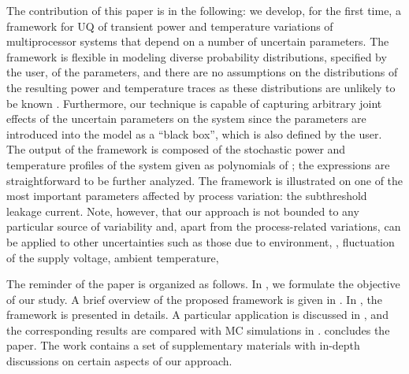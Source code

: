 The contribution of this paper is in the following: we develop, for the first time, a framework for UQ of transient power and temperature variations of multiprocessor systems that depend on a number of uncertain parameters. The framework is flexible in modeling diverse probability distributions, specified by the user, of the parameters, and there are no assumptions on the distributions of the resulting power and temperature traces as these distributions are unlikely to be known \apriori. Furthermore, our technique is capable of capturing arbitrary joint effects of the uncertain parameters on the system since the parameters are introduced into the model as a ``black box'', which is also defined by the user. The output of the framework is composed of the stochastic power and temperature profiles of the system given as polynomials of \rvs; the expressions are straightforward to be further analyzed. The framework is illustrated on one of the most important parameters affected by process variation: the subthreshold leakage current. Note, however, that our approach is not bounded to any particular source of variability and, apart from the process-related variations, can be applied to other uncertainties such as those due to environment, \ie, fluctuation of the supply voltage, ambient temperature, \etc

The reminder of the paper is organized as follows. In , we formulate the objective of our study. A brief overview of the proposed framework is given in . In , the framework is presented in details. A particular application is discussed in , and the corresponding results are compared with MC simulations in .  concludes the paper. The work contains a set of supplementary materials with in-depth discussions on certain aspects of our approach.
